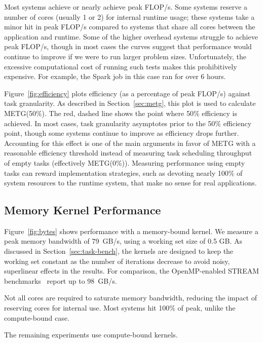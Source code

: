Most systems achieve or nearly achieve peak FLOP/s. Some
systems reserve a number of cores (usually 1 or 2) for internal
runtime usage; these systems take a minor hit in peak FLOP/s compared
to systems that share all cores between the application and runtime. Some of the
higher overhead systems struggle to achieve peak FLOP/s, though in most cases
the curves suggest that performance would continue to improve if we
were to run larger problem sizes. Unfortunately, the excessive
computational cost of running such tests makes this prohibitively
expensive. For example, the Spark job in
this case ran for over 6 hours.

Figure~\ref{fig:efficiency} plots efficiency (as a percentage of
peak FLOP/s) against task granularity. As described in Section~\ref{sec:metg}, this plot is
used to calculate METG(50\%). The
red, dashed line shows the point where 50\% efficiency is achieved.
In most cases, task granularity asymptotes prior to the 50\% efficiency point,
though some systems continue to improve as efficiency drops further. Accounting for this effect is one of the main arguments in
favor of METG with a reasonable efficiency threshold instead of
measuring task scheduling throughput of empty tasks
(effectively METG(0\%)). Measuring performance using empty tasks can
reward implementation strategies, such as devoting nearly 100\% of
system resources to the runtime system, that make no sense for real
applications.

\subsection{Memory Kernel Performance}

Figure~\ref{fig:bytes} shows performance with a memory-bound kernel. We measure a peak memory
bandwidth of 79~GB/s, using a working set size of 0.5 GB. As discussed in Section~\ref{sec:task-bench}, the kernels are designed to keep the working set constant as the number of iterations decrease to avoid noisy, superlinear effects in the results. For comparison, the
OpenMP-enabled STREAM benchmarks~\cite{STREAM} report up to 98~GB/s.

Not all cores are required to saturate memory bandwidth, reducing the
impact of reserving cores for internal use. Most systems hit 100\% of
peak, unlike the compute-bound case.

The remaining experiments use compute-bound kernels.



